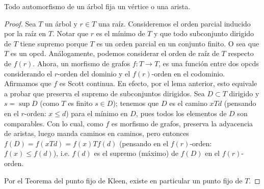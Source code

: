 \documentclass[../main.tex]{subfiles}
\begin{document}
\begin{corollary}
    Todo automorfismo de un árbol fija un vértice o una arista.
\end{corollary}
\begin{proof}
Sea $T$ un árbol y $r \in T$ una raíz. Consideremos el orden parcial inducido por la raíz en $T$. Notar que $
r$ es el mínimo de $T$ y que todo subconjunto dirigido de $T$ tiene supremo porque $T$ es un orden parcial en
 un conjunto finito. O sea que $T$ es un opcd. Análogamente, podemos considerar el orden de raíz de $T$
 respecto de $f(r)$. Ahora, un morfismo de grafos $f : T \rightarrow T$, es una función entre dos opcds
 considerando el $r$-orden del dominio y el $f(r)$-orden en el codominio. Afirmamos que $f$
 es Scott continua. En efecto, por el lema anterior, esto equivale a probar que preserva el supremo de
 subconjuntos dirigidos. Sea $D \subset T$ dirigido y $s = \sup D$ (como $T$ es finito $s \in D$); tenemos
 que $D$ es el camino $xTd$ (pensando en el $r$-orden: $x \leq d$) para el mínimo en $D$, pues todos
 los
 elementos de $D$ son
 comparables.
 Con lo
 cual, como $f$ es morfismo de grafos, preserva la adyacencia de aristas, luego manda caminos en caminos,
 pero entonces $f(D) = f(xTd) =f(x) T f(d) $ (pensando en el $f(r)$-orden: $f(x) \leq f(d)$), i.e. $f(d)$ es
 el supremo (máximo) de $f(D)$ en el $f(r)$-orden.

 Por el Teorema del punto fijo de Kleen, existe en particular un punto fijo de $T$.
\end{proof}
\end{document}
